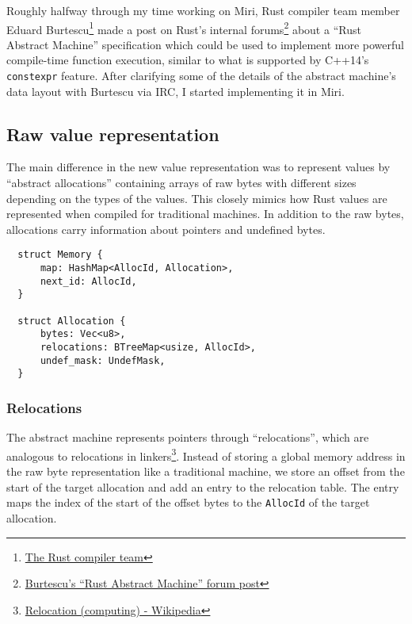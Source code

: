 \documentclass[twocolumn]{article}
\newcommand{\rust}[1]{\texttt{#1}}
\begin{document}
Roughly halfway through my time working on Miri, Rust compiler team member Eduard
Burtescu\footnote{\href{https://www.rust-lang.org/team.html\#Compiler}{The Rust compiler team}} made
a post on Rust's internal
forums\footnote{\href{https://internals.rust-lang.org/t/mir-constant-evaluation/3143/31}{Burtescu's
``Rust Abstract Machine'' forum post}} about a ``Rust Abstract Machine'' specification which could
be used to implement more powerful compile-time function execution, similar to what is supported by
C++14's \texttt{constexpr} feature. After clarifying some of the details of the abstract
machine's data layout with Burtescu via IRC, I started implementing it in Miri.

\subsection{Raw value representation}

The main difference in the new value representation was to represent values by ``abstract
allocations'' containing arrays of raw bytes with different sizes depending on the types of the
values. This closely mimics how Rust values are represented when compiled for traditional machines.
In addition to the raw bytes, allocations carry information about pointers and undefined bytes.

\begin{verbatim}
  struct Memory {
      map: HashMap<AllocId, Allocation>,
      next_id: AllocId,
  }

  struct Allocation {
      bytes: Vec<u8>,
      relocations: BTreeMap<usize, AllocId>,
      undef_mask: UndefMask,
  }
\end{verbatim}

\subsubsection{Relocations}

The abstract machine represents pointers through ``relocations'', which are analogous to relocations
in linkers\footnote{\href{https://en.wikipedia.org/wiki/Relocation_(computing)}{Relocation
(computing) - Wikipedia}}. Instead of storing a global memory address in the raw byte representation
like a traditional machine, we store an offset from the start of the target allocation and add an
entry to the relocation table. The entry maps the index of the start of the offset bytes to the
\rust{AllocId} of the target allocation.
\end{document}
